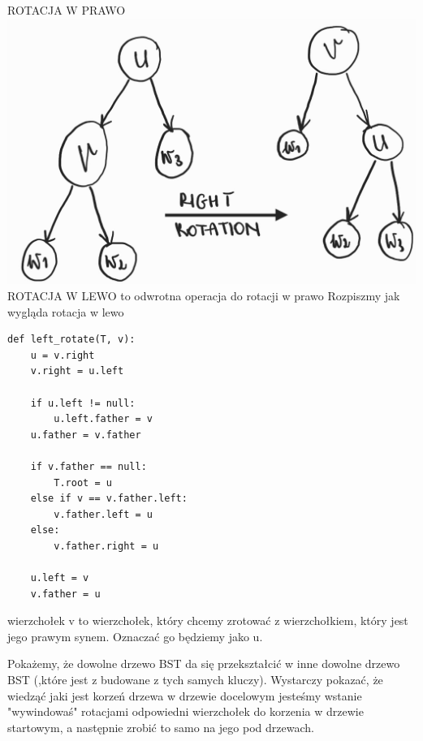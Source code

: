 \documentclass[12pt]{article}
\begin{document}
ROTACJA W PRAWO
\includegraphics[scale=0.2]{zad6_1.png}
ROTACJA W LEWO to odwrotna operacja do rotacji w prawo
Rozpiszmy jak wygląda rotacja w lewo
\begin{lstlisting}
def left_rotate(T, v):
    u = v.right
    v.right = u.left
    
    if u.left != null:
        u.left.father = v
    u.father = v.father
    
    if v.father == null:
        T.root = u
    else if v == v.father.left:
        v.father.left = u
    else:
        v.father.right = u
        
    u.left = v
    v.father = u
\end{lstlisting}
wierzchołek v to wierzchołek, który chcemy zrotować z wierzchołkiem, który jest jego prawym synem. Oznaczać go będziemy jako u.

Pokażemy, że dowolne drzewo BST da się przekształcić w inne dowolne drzewo BST (,które jest z budowane z tych samych kluczy).
Wystarczy pokazać, że wiedząć jaki jest korzeń drzewa w drzewie docelowym jesteśmy wstanie "wywindowaś" rotacjami odpowiedni wierzchołek do korzenia w drzewie startowym, a następnie zrobić to samo na jego pod drzewach.
\end{document}
